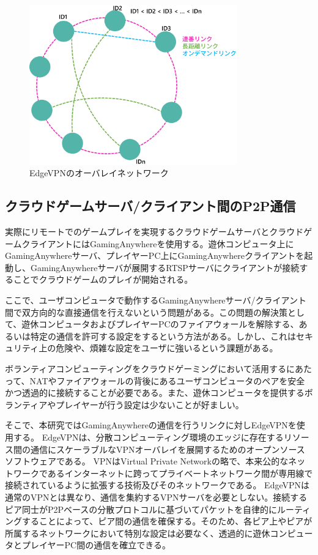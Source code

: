 \begin{figure}[h!]
    \centering
    \includegraphics[width=0.8\textwidth,keepaspectratio,clip]{img/overlay_topology.eps}
    \caption{EdgeVPNのオーバレイネットワーク}
    \label{fig:overlay}
\end{figure}

\subsection{クラウドゲームサーバ/クライアント間のP2P通信}
実際にリモートでのゲームプレイを実現するクラウドゲームサーバとクラウドゲームクライアントにはGamingAnywhereを使用する。遊休コンピュータ上にGamingAnywhereサーバ、プレイヤーPC上にGamingAnywhereクライアントを起動し、GamingAnywhereサーバが展開するRTSPサーバにクライアントが接続することでクラウドゲームのプレイが開始される。

ここで、ユーザコンピュータで動作するGamingAnywhereサーバ/クライアント間で双方向的な直接通信を行えないという問題がある。この問題の解決策として、遊休コンピュータおよびプレイヤーPCのファイアウォールを解除する、あるいは特定の通信を許可する設定をするという方法がある。しかし、これはセキュリティ上の危険や、煩雑な設定をユーザに強いるという課題がある。

ボランティアコンピューティングをクラウドゲーミングにおいて活用するにあたって、NATやファイアウォールの背後にあるユーザコンピュータのペアを安全かつ透過的に接続することが必要である。また、遊休コンピュータを提供するボランティアやプレイヤーが行う設定は少ないことが好ましい。

そこで、本研究ではGamingAnywhereの通信を行うリンクに対しEdgeVPN\cite{edgevpn}を使用する。
EdgeVPNは、分散コンピューティング環境のエッジに存在するリソース間の通信にスケーラブルなVPNオーバレイを展開するためのオープンソースソフトウェアである。
VPNはVirtual Private Networkの略で、本来公的なネットワークであるインターネットに跨ってプライベートネットワーク間が専用線で接続されているように拡張する技術及びそのネットワークである。
EdgeVPNは通常のVPNとは異なり、通信を集約するVPNサーバを必要としない。接続するピア同士がP2Pベースの分散プロトコルに基づいてパケットを自律的にルーティングすることによって、ピア間の通信を確保する。そのため、各ピア上やピアが所属するネットワークにおいて特別な設定は必要なく、透過的に遊休コンピュータとプレイヤーPC間の通信を確立できる。

